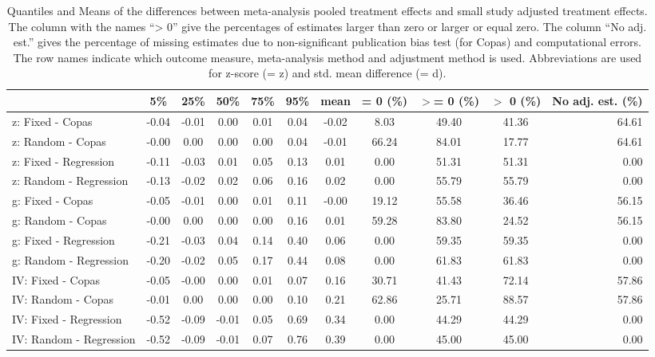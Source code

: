 \documentclass[11pt,a4paper,twoside]{book}\usepackage[]{graphicx}\usepackage[]{color}
\begin{document}
\begin{table}[ht]
\centering
\begingroup\scriptsize
\begin{tabular}{lcccccccccr}
  \hline
 & 5\% & 25\% & 50\% & 75\% & 95\% & mean & = 0 (\%) & $>$= 0 (\%) & $>$ 0 (\%) & No adj. est. (\%) \\ 
  \hline
z: Fixed - Copas & -0.04 & -0.01 & 0.00 & 0.01 & 0.04 & -0.02 & 8.03 & 49.40 & 41.36 & 64.61 \\ 
  z: Random - Copas & -0.00 & 0.00 & 0.00 & 0.00 & 0.04 & -0.01 & 66.24 & 84.01 & 17.77 & 64.61 \\ 
  z: Fixed - Regression & -0.11 & -0.03 & 0.01 & 0.05 & 0.13 & 0.01 & 0.00 & 51.31 & 51.31 & 0.00 \\ 
  z: Random - Regression & -0.13 & -0.02 & 0.02 & 0.06 & 0.16 & 0.02 & 0.00 & 55.79 & 55.79 & 0.00 \\ 
  g: Fixed - Copas & -0.05 & -0.01 & 0.00 & 0.01 & 0.11 & -0.00 & 19.12 & 55.58 & 36.46 & 56.15 \\ 
  g: Random - Copas & -0.00 & 0.00 & 0.00 & 0.00 & 0.16 & 0.01 & 59.28 & 83.80 & 24.52 & 56.15 \\ 
  g: Fixed - Regression & -0.21 & -0.03 & 0.04 & 0.14 & 0.40 & 0.06 & 0.00 & 59.35 & 59.35 & 0.00 \\ 
  g: Random - Regression & -0.20 & -0.02 & 0.05 & 0.17 & 0.44 & 0.08 & 0.00 & 61.83 & 61.83 & 0.00 \\ 
  IV: Fixed - Copas & -0.05 & -0.00 & 0.00 & 0.01 & 0.07 & 0.16 & 30.71 & 41.43 & 72.14 & 57.86 \\ 
  IV: Random - Copas & -0.01 & 0.00 & 0.00 & 0.00 & 0.10 & 0.21 & 62.86 & 25.71 & 88.57 & 57.86 \\ 
  IV: Fixed - Regression & -0.52 & -0.09 & -0.01 & 0.05 & 0.69 & 0.34 & 0.00 & 44.29 & 44.29 & 0.00 \\ 
  IV: Random - Regression & -0.52 & -0.09 & -0.01 & 0.07 & 0.76 & 0.39 & 0.00 & 45.00 & 45.00 & 0.00 \\ 
   \hline
\end{tabular}
\endgroup
\caption{Quantiles and Means of the differences between meta-analysis pooled treatment effects and small study adjusted treatment effects. The column with the names ``> 0'' give the percentages of estimates larger than zero or larger or equal zero. The column ``No adj. est.'' gives the percentage of missing estimates due to non-significant publication bias test (for Copas) and computational errors. The row names indicate which outcome measure, meta-analysis method and adjustment method is used. Abbreviations are used for z-score (= z) and std. mean difference (= d).} 
\label{adjustment.difference}
\end{table}
\end{document}
